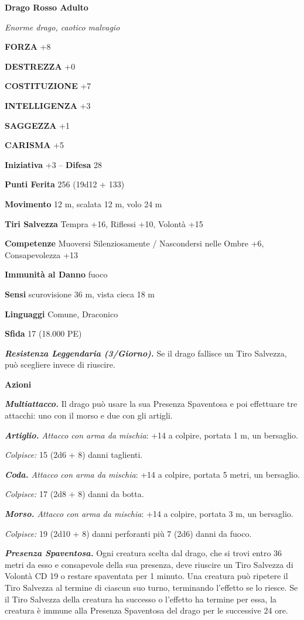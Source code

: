 \begin{multicols}{2}
\medskip{}\textbf{Drago Rosso Adulto}

\emph{Enorme drago, caotico malvagio}

\textbf{FORZA} +8

\textbf{DESTREZZA} +0

\textbf{COSTITUZIONE} +7

\textbf{INTELLIGENZA} +3

\textbf{SAGGEZZA} +1

\textbf{CARISMA} +5

\textbf{Iniziativa} +3 -- \textbf{Difesa} 28

\textbf{Punti Ferita} 256 (19d12 + 133) 

\textbf{Movimento} 12 m, scalata 12 m, volo 24 m

\textbf{Tiri Salvezza} Tempra +16, Riflessi +10, Volontà +15

\textbf{Competenze} Muoversi Silenziosamente / Nascondersi nelle Ombre +6, Consapevolezza +13

\textbf{Immunità al Danno} fuoco

\textbf{Sensi} scurovisione 36 m, vista cieca 18 m 

\textbf{Linguaggi} Comune, Draconico

\textbf{Sfida} 17 (18.000 PE)

\emph{\textbf{Resistenza Leggendaria (3/Giorno).}} Se il drago fallisce un Tiro Salvezza, può scegliere invece di riuscire.

\textbf{Azioni}

\emph{\textbf{Multiattacco.}} Il drago può usare la sua Presenza Spaventosa e poi effettuare tre attacchi: uno con il morso e due con gli artigli.

\emph{\textbf{Artiglio.} Attacco con arma da mischia}: +14 a colpire, portata 1 m, un bersaglio.

\emph{Colpisce:} 15 (2d6 + 8) danni taglienti.

\emph{\textbf{Coda.} Attacco con arma da mischia}: +14 a colpire, portata 5 metri, un bersaglio.

\emph{Colpisce:} 17 (2d8 + 8) danni da botta.

\emph{\textbf{Morso.} Attacco con arma da mischia}: +14 a colpire, portata 3 m, un bersaglio.

\emph{Colpisce:} 19 (2d10 + 8) danni perforanti più 7 (2d6) danni da
fuoco.

\emph{\textbf{Presenza Spaventosa.}} Ogni creatura scelta dal drago, che si trovi entro 36 metri da esso e consapevole della sua presenza, deve riuscire un Tiro Salvezza di Volontà CD 19 o restare spaventata per 1 minuto. Una creatura può ripetere il Tiro Salvezza al termine di ciascun suo turno, terminando l'effetto se lo riesce. Se il Tiro Salvezza della creatura ha successo o l'effetto ha termine per essa, la creatura è  immune alla Presenza Spaventosa del drago per le successive 24 ore.


\end{multicols}
